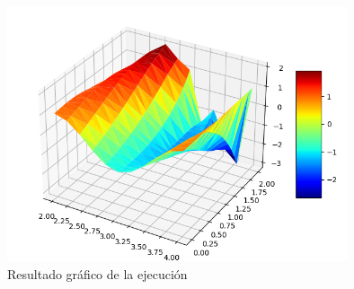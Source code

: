 \documentclass[a4paper,12pt]{article}
\begin{document}
\begin{figure}[H]
  \centering
  \includegraphics[width=10cm]{grafico}
  \caption{Resultado gráfico de la ejecución}
  \label{fig:grafico}
\end{figure}
\end{document}
